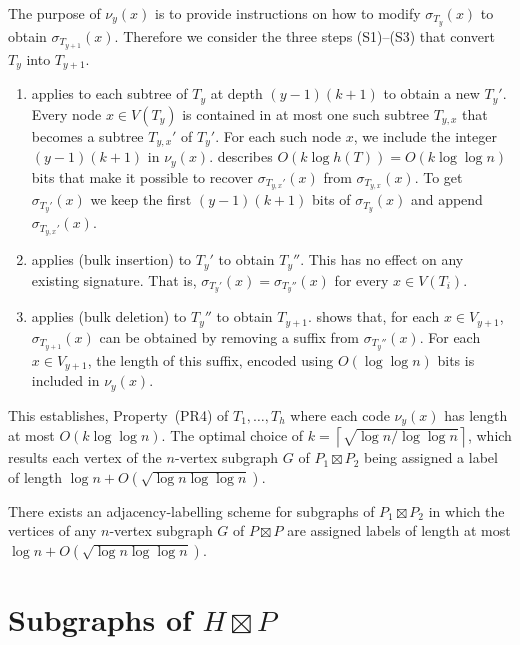 \documentclass[kpfonts]{patmorin}
\begin{document}
The purpose of $\nu_y(x)$ is to provide instructions on how to modify $\sigma_{T_y}(x)$ to obtain $\sigma_{T_{y+1}}(x)$.  Therefore we consider the three steps (S1)--(S3) that convert $T_y$ into $T_{y+1}$.  
\begin{enumerate}[(S1)]
  \item applies  to each subtree of $T_y$ at depth $(y-1)(k+1)$ to obtain a new $T_y'$.  Every node $x\in V(T_y)$ is contained in at most one such subtree $T_{y,x}$ that becomes a subtree $T_{y,x}'$ of $T_y'$.  For each such node $x$, we include the integer $(y-1)(k+1)$ in $\nu_y(x)$.  describes $O(k\log h(T))=O(k\log\log n)$ bits that make it possible to recover $\sigma_{T_{y,x}'}(x)$ from $\sigma_{T_{y,x}}(x)$.  To get $\sigma_{T_y'}(x)$ we keep the first $(y-1)(k+1)$ bits of $\sigma_{T_y}(x)$ and append $\sigma_{T_{y,x}'}(x)$.
  
  \item applies  (bulk insertion) to $T_{y}'$ to obtain $T_{y}''$.  This has no effect on any existing signature.  That is, $\sigma_{T_y'}(x)=\sigma_{T_{y}''}(x)$ for every $x\in V(T_i)$.
  
  \item applies  (bulk deletion) to $T_{y}''$ to obtain $T_{y+1}$.  shows that, for each $x\in V_{y+1}$, $\sigma_{T_{y+1}}(x)$ can be obtained by removing a suffix from $\sigma_{T_y''}(x)$.  For each $x\in V_{y+1}$, the length of this suffix, encoded using $O(\log\log n)$ bits is included in $\nu_{y}(x)$.
\end{enumerate}

This establishes, Property~(PR4) of $T_1,\ldots,T_h$ where each code $\nu_y(x)$ has length at most $O(k\log\log n)$. The optimal choice of $k=\left\lceil\sqrt{\log n/\log\log n}\right\rceil$, which results each vertex of the $n$-vertex subgraph $G$ of $P_1\boxtimes P_2$ being assigned a label of length $\log n + O(\sqrt{\log n\log\log n})$.

\begin{thm}
  There exists an adjacency-labelling scheme for subgraphs of $P_1\boxtimes P_2$ in which the vertices of any $n$-vertex subgraph $G$ of $P\boxtimes P$ are assigned labels of length at most $\log n + O(\sqrt{\log n\log\log n})$.
\end{thm}

\section{Subgraphs of $H\boxtimes P$}
\end{document}
